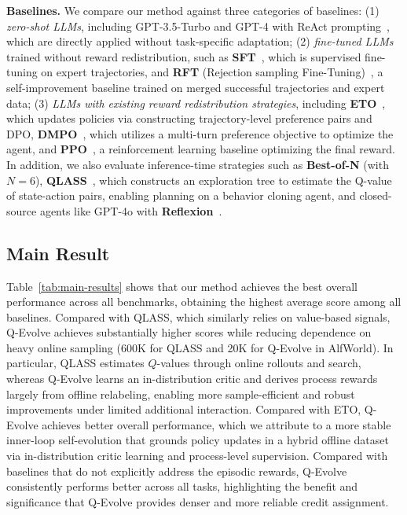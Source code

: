 \documentclass{article}
\theoremstyle{plain}
\theoremstyle{definition}
\theoremstyle{remark}
\begin{document}
\textbf{Baselines.} 
We compare our method against three categories of baselines: 
(1) \emph{zero-shot LLMs}, including GPT-3.5-Turbo and GPT-4 with ReAct prompting~\citep{shinn2023reflexion}, which are directly applied without task-specific adaptation; 
(2) \emph{fine-tuned LLMs} trained without reward redistribution, such as \textbf{SFT}~\citep{chen2023fireact}, which is supervised fine-tuning on expert trajectories, and \textbf{RFT} (Rejection sampling Fine-Tuning)~\citep{zhang2023cumulative}, a self-improvement baseline trained on merged successful trajectories and expert data; 
(3) \emph{LLMs with existing reward redistribution strategies}, including \textbf{ETO}~\citep{song2024trial}, which updates policies via constructing trajectory-level preference pairs and DPO, \textbf{DMPO}~\citep{dmpo}, which utilizes a multi-turn preference objective to optimize the agent, and \textbf{PPO}~\citep{schulman2017proximalpolicyoptimizationalgorithms}, a reinforcement learning baseline optimizing the final reward. 
In addition, we also evaluate inference-time strategies such as \textbf{Best-of-N} (with $N=6$), \textbf{QLASS}~\cite{lin2025qlass}, which constructs an exploration tree to estimate the Q-value of state-action pairs, enabling planning on a behavior cloning agent, and closed-source agents like GPT-4o with \textbf{Reflexion}~\citep{shinn2023reflexion}. 



\subsection{Main Result}

Table~\ref{tab:main-results} shows that our method achieves the best overall performance across all benchmarks, obtaining the highest average score among all baselines. 
Compared with QLASS, which similarly relies on value-based signals, Q-Evolve achieves substantially higher scores while reducing dependence on heavy online sampling (600K for QLASS and 20K for Q-Evolve in AlfWorld). In particular, QLASS estimates $Q$-values through online rollouts and search, whereas Q-Evolve learns an in-distribution critic and derives process rewards largely from offline relabeling, enabling more sample-efficient and robust improvements under limited additional interaction.
Compared with ETO, Q-Evolve achieves better overall performance, which we attribute to a more stable inner-loop self-evolution that grounds policy updates in a hybrid offline dataset via in-distribution critic learning and process-level supervision.
Compared with baselines that do not explicitly address the episodic rewards, Q-Evolve consistently performs better across all tasks, highlighting the benefit and significance that Q-Evolve provides denser and more reliable credit assignment. 
\end{document}
